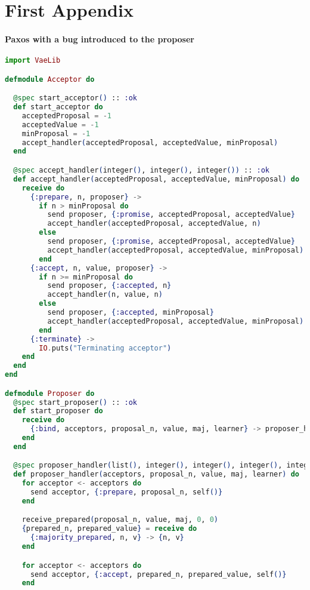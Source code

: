 \appendix
\chapter{First Appendix}

\subsubsection{Paxos with a bug introduced to the proposer}
\begin{lstlisting}[language=Elixir, xleftmargin=.1\linewidth]
import VaeLib

defmodule Acceptor do

  @spec start_acceptor() :: :ok
  def start_acceptor do
    acceptedProposal = -1
    acceptedValue = -1
    minProposal = -1
    accept_handler(acceptedProposal, acceptedValue, minProposal)
  end

  @spec accept_handler(integer(), integer(), integer()) :: :ok
  def accept_handler(acceptedProposal, acceptedValue, minProposal) do
    receive do
      {:prepare, n, proposer} ->
        if n > minProposal do
          send proposer, {:promise, acceptedProposal, acceptedValue}
          accept_handler(acceptedProposal, acceptedValue, n)
        else
          send proposer, {:promise, acceptedProposal, acceptedValue}
          accept_handler(acceptedProposal, acceptedValue, minProposal)
        end
      {:accept, n, value, proposer} ->
        if n >= minProposal do
          send proposer, {:accepted, n}
          accept_handler(n, value, n)
        else
          send proposer, {:accepted, minProposal}
          accept_handler(acceptedProposal, acceptedValue, minProposal)
        end
      {:terminate} ->
        IO.puts("Terminating acceptor")
    end
  end
end

defmodule Proposer do
  @spec start_proposer() :: :ok
  def start_proposer do
    receive do
      {:bind, acceptors, proposal_n, value, maj, learner} -> proposer_handler(acceptors, proposal_n, value, maj, learner)
    end
  end

  @spec proposer_handler(list(), integer(), integer(), integer(), integer()) :: :ok
  def proposer_handler(acceptors, proposal_n, value, maj, learner) do
    for acceptor <- acceptors do
      send acceptor, {:prepare, proposal_n, self()}
    end

    receive_prepared(proposal_n, value, maj, 0, 0)
    {prepared_n, prepared_value} = receive do
      {:majority_prepared, n, v} -> {n, v}
    end

    for acceptor <- acceptors do
      send acceptor, {:accept, prepared_n, prepared_value, self()}
    end


\end{lstlisting}

